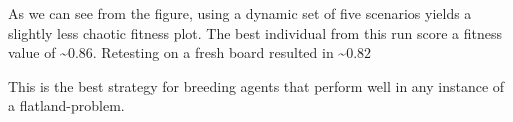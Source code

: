 \documentclass[twoside]{article}
\begin{document}
\begin{multicols}{2}
  As we can see from the figure, using a dynamic set of five scenarios yields a slightly less chaotic fitness plot.
  The best individual from this run score a fitness value of \textasciitilde $0.86$.
  Retesting on a fresh board resulted in \textasciitilde $0.82$

  This is the best strategy for breeding agents that perform well in any instance of a flatland-problem.

\end{multicols}

%
%
\end{document}
